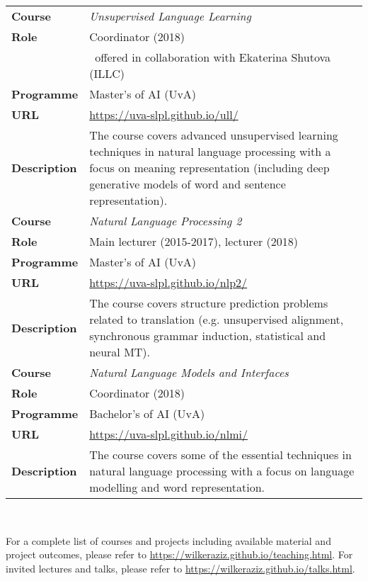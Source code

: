 \begin{center}
\begin{tabular}{l p{}} \hline
{\bf Course} & {\it Unsupervised Language Learning} \\
{\bf Role}   & Coordinator (2018) \\
 & ~offered in collaboration with Ekaterina Shutova (ILLC)\\
{\bf Programme} & Master's of AI (UvA)\\
{\bf URL} & \url{https://uva-slpl.github.io/ull/} \\
{\bf Description} & The course covers advanced unsupervised learning techniques in natural language processing with a focus on meaning representation (including deep generative models of word and sentence representation).
\\ \hline
{\bf Course} & {\it Natural Language Processing 2} \\
{\bf Role}   & Main lecturer (2015-2017), lecturer (2018) \\
{\bf Programme} & Master's of AI (UvA)\\
{\bf URL} & \url{https://uva-slpl.github.io/nlp2/} \\
{\bf Description} & The course covers structure prediction problems related to translation (e.g. unsupervised alignment, synchronous grammar induction, statistical and neural MT). 
\\ \hline
{\bf Course} & {\it Natural Language Models and Interfaces} \\
{\bf Role}   & Coordinator (2018) \\
{\bf Programme} & Bachelor's of AI (UvA)\\
{\bf URL} & \url{https://uva-slpl.github.io/nlmi/} \\
{\bf Description} & The course covers some of the essential techniques in natural language processing with a focus on language modelling and word representation.
\\ \hline
\end{tabular}
\end{center}

~

For a complete list of courses and projects including available material and project outcomes, please refer to \url{https://wilkeraziz.github.io/teaching.html}.
For invited lectures and talks, please refer to \url{https://wilkeraziz.github.io/talks.html}.

